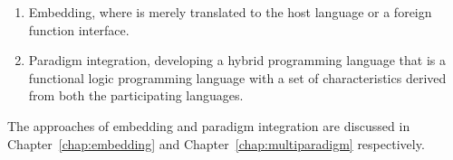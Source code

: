 \documentclass[thesis-solanki.tex]{subfiles}
\begin{document}
\begin{enumerate}
\item
  Embedding, where  is merely translated to the host language  or a foreign
  function interface.

\item
  Paradigm integration, developing a hybrid programming language that is a functional logic programming language
  with a set of characteristics derived from both the participating languages.
\end{enumerate}
The approaches of embedding and paradigm integration are discussed in Chapter~\ref{chap:embedding} and
Chapter~\ref{chap:multiparadigm} respectively.


\ifMain\ifDraft
\begin{scope}
  \nolinenumbers
  \enotesize
  \par
  \begin{singlespace}
  \setlength{\parskip}{12pt plus 2pt minus 1pt}
  \theendnotes
  \par
  \end{singlespace}
\end{scope}
\fi\fi
\end{document}
